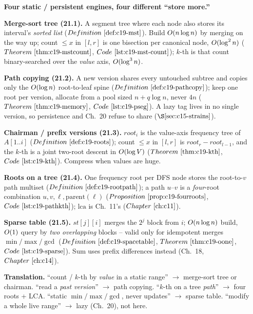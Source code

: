 \begin{quickref}
\textbf{Four static / persistent engines, four different ``store more.'' }

\medskip
\textbf{Merge-sort tree (21.1).} A segment tree where each node also stores its interval's
\emph{sorted list} (\(\defref{c19-mst}\)). Build \(O(n\log n)\) by merging on the way up;
count \(\le x\) in \([l,r]\) is one bisection per canonical node, \(O(\log^2 n)\)
(\(\thmref{c19-mstcount}\), \(\coderef{c19-mst-count}\)); \(k\)-th is that count
binary-searched over the \emph{value} axis, \(O(\log^3 n)\).

\medskip
\textbf{Path copying (21.2).} A new version shares every untouched subtree and copies only
the \(O(\log n)\) root-to-leaf spine (\(\defref{c19-pathcopy}\)); keep one root per
version, allocate from a pool sized \(n+q\log n\), never \(4n\) (\(\thmref{c19-memory}\),
\(\coderef{c19-pseg}\)). A lazy tag lives in no single version, so persistence and Ch.~20
refuse to share (\(\secref{c15-strains}\)).

\medskip
\textbf{Chairman / prefix versions (21.3).} \(\mathit{root}_i\) is the value-axis frequency
tree of \(A[1..i]\) (\(\defref{c19-roots}\)); count \(\le x\) in \([l,r]\) is
\(\mathit{root}_r-\mathit{root}_{l-1}\), and the \(k\)-th is a joint two-root descent in
\(O(\log V)\) (\(\thmref{c19-kth}\), \(\coderef{c19-kth}\)). Compress when values are huge.

\medskip
\textbf{Roots on a tree (21.4).} One frequency root per DFS node stores the root-to-\(v\) path
multiset (\(\defref{c19-rootpath}\)); a path \(u\text{--}v\) is a \emph{four}-root combination
\(u,v,\ell,\mathrm{parent}(\ell)\) (\(\propref{c19-fourroots}\), \(\coderef{c19-pathkth}\));
\(\mathrm{lca}\) is Ch.~11's (\(\chref{c11}\)).

\medskip
\textbf{Sparse table (21.5).} \(\mathit{st}[j][i]\) merges the \(2^j\) block from \(i\);
\(O(n\log n)\) build, \(O(1)\) query by \emph{two overlapping} blocks -- valid only for
idempotent merges \(\min/\max/\gcd\) (\(\defref{c19-spacetable}\), \(\thmref{c19-oone}\),
\(\coderef{c19-sparse}\)). Sum uses prefix differences instead (Ch.~18, \(\chref{c14}\)).

\medskip
\textbf{Translation.} ``count / \(k\)-th by \emph{value} in a static range'' \(\to\) merge-sort
tree or chairman. ``read a \emph{past version}'' \(\to\) path copying. ``\(k\)-th on a tree
\emph{path}'' \(\to\) four roots + LCA. ``static \(\min/\max/\gcd\), never updates'' \(\to\)
sparse table. ``modify a whole live range'' \(\to\) lazy (Ch.~20), not here.
\end{quickref}


